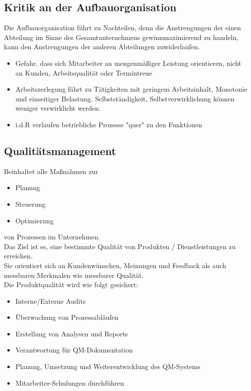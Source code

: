 \documentclass[asp1.tex]{subfiles}
\begin{document}
\subsection{Kritik an der Aufbauorganisation}
Die Aufbauorganisation führt zu Nachteilen, denn die Anstrengungen der einen Abteilung im Sinne des Gesamtunternehmens gewinnmaximierend zu handeln, kann den Anstrengungen der anderen Abteilungen zuwiderlaufen.
\begin{itemize}
    \item Gefahr, dass sich Mitarbeiter an mengenmäßiger Leistung orientieren, nicht an Kunden, Arbeitsqualität oder Termintreue
    \item Arbeitszerlegung fährt zu Tätigkeiten mit geringem Arbeitsinhalt, Monotonie und einseitiger Belastung. Selbstst\"andigkeit, Selbstverwirklichung k\"onnen weniger verwirklicht werden.
    \item i.d.R verlaufen betriebliche Prozesse "quer" zu den Funktionen
\end{itemize}

\subsection{Qualitätsmanagement}
Beinhaltet alle Maßnahmen zur
\begin{itemize}
    \item Planung
    \item Steuerung
    \item Optimierung
\end{itemize}
von Prozessen im Unternehmen. \\
Das Ziel ist es, eine bestimmte Qualität von Produkten /  Dienstleistungen zu erreichen. \\
Sie orientiert sich an Kundenwünschen, Meinungen und Feedback als auch messbaren  Merkmalen wie messbarer Qualit\"at.  \\
Die Produktqualität wird wie folgt gesichert:
\begin{itemize}
    \item Interne/Externe Audits
    \item \"Uberwachung von Prozessabl\"aufen
    \item Erstellung von Analysen und Reports
    \item Verantwortung für QM-Dokumentation
    \item Planung, Umsetzung und Weiterentwicklung des QM-Systems
    \item Mitarbeiter-Schulungen durchführen
\end{itemize}
\end{document}
